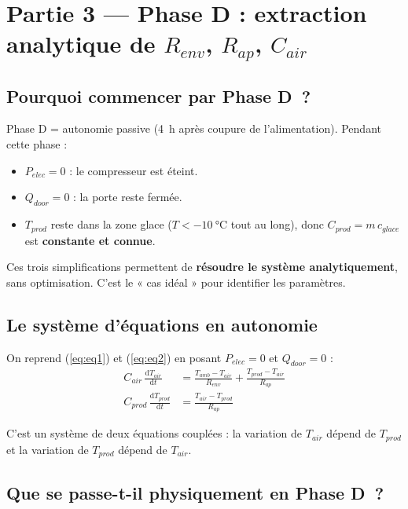 \documentclass[11pt,a4paper]{article}
\begin{document}
\section{Partie 3 — Phase D : extraction analytique de \texorpdfstring{$R_{env}$}{R\_env}, \texorpdfstring{$R_{ap}$}{R\_ap}, \texorpdfstring{$C_{air}$}{C\_air}}

\subsection{Pourquoi commencer par Phase D~?}

Phase D = autonomie passive (\SI{4}{\hour} après coupure de l'alimentation). Pendant cette
phase :
\begin{itemize}[itemsep=0pt]
\item $P_{elec} = 0$ : le compresseur est éteint.
\item $Q_{door} = 0$ : la porte reste fermée.
\item $T_{prod}$ reste dans la zone glace ($T < -\SI{10}{\celsius}$ tout au long), donc
$C_{prod} = m\,c_{glace}$ est \textbf{constante et connue}.
\end{itemize}

Ces trois simplifications permettent de \textbf{résoudre le système analytiquement}, sans
optimisation. C'est le « cas idéal » pour identifier les paramètres.

\subsection{Le système d'équations en autonomie}

\begin{demo}
On reprend (\ref{eq:eq1}) et (\ref{eq:eq2}) en posant $P_{elec} = 0$ et $Q_{door} = 0$ :
\begin{align}
C_{air}\,\frac{\mathrm{d}T_{air}}{\mathrm{d}t} &= \frac{T_{amb}-T_{air}}{R_{env}} + \frac{T_{prod}-T_{air}}{R_{ap}} \label{eq:phaseD1}\\
C_{prod}\,\frac{\mathrm{d}T_{prod}}{\mathrm{d}t} &= \frac{T_{air}-T_{prod}}{R_{ap}} \label{eq:phaseD2}
\end{align}
\end{demo}

C'est un système de deux équations couplées : la variation de $T_{air}$ dépend de $T_{prod}$
et la variation de $T_{prod}$ dépend de $T_{air}$.

\subsection{Que se passe-t-il physiquement en Phase D~?}
\end{document}

